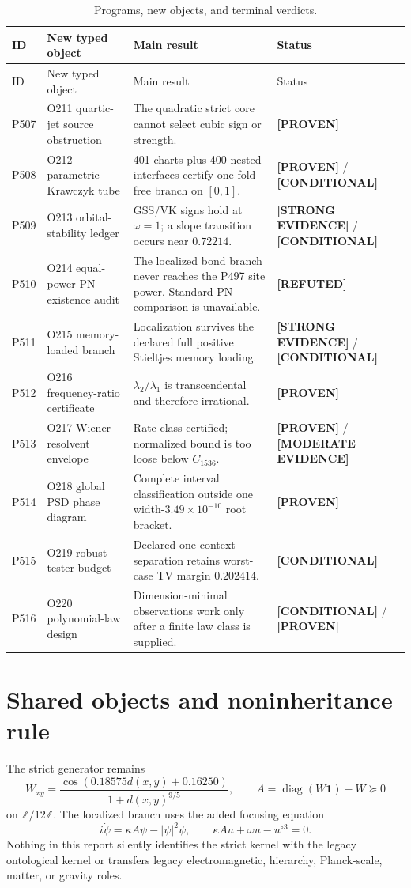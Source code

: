 \documentclass[11pt,a4paper]{article}
\theoremstyle{definition}
\theoremstyle{remark}
\newcommand{\Z}{\mathbb Z}
\newcommand{\status}[2]{\textcolor{#1}{\textbf{[#2]}}}
\newcommand{\proven}{\status{fingreen}{PROVEN}}
\newcommand{\strong}{\status{finblue}{STRONG EVIDENCE}}
\newcommand{\moderate}{\status{finorange}{MODERATE EVIDENCE}}
\newcommand{\refuted}{\status{finred}{REFUTED}}
\newcommand{\conditional}{\status{fingray}{CONDITIONAL}}
\begin{document}
\begin{longtable}{@{}p{}p{}p{}p{}@{}}
\caption{Programs, new objects, and terminal verdicts.}\\
\toprule
ID & New typed object & Main result & Status\\
\midrule
\endfirsthead
\toprule
ID & New typed object & Main result & Status\\
\midrule
\endhead
P507 & O211 quartic-jet source obstruction & The quadratic strict core cannot select cubic sign or strength. & \proven\\
P508 & O212 parametric Krawczyk tube & 401 charts plus 400 nested interfaces certify one fold-free branch on $[0,1]$. & \proven{} / \conditional\\
P509 & O213 orbital-stability ledger & GSS/VK signs hold at $\omega=1$; a slope transition occurs near $0.72214$. & \strong{} / \conditional\\
P510 & O214 equal-power PN existence audit & The localized bond branch never reaches the P497 site power. Standard PN comparison is unavailable. & \refuted\\
P511 & O215 memory-loaded branch & Localization survives the declared full positive Stieltjes memory loading. & \strong{} / \conditional\\
P512 & O216 frequency-ratio certificate & $\lambda_2/\lambda_1$ is transcendental and therefore irrational. & \proven\\
P513 & O217 Wiener--resolvent envelope & Rate class certified; normalized bound is too loose below $C_{1536}$. & \proven{} / \moderate\\
P514 & O218 global PSD phase diagram & Complete interval classification outside one width-$3.49\times10^{-10}$ root bracket. & \proven\\
P515 & O219 robust tester budget & Declared one-context separation retains worst-case TV margin $0.202414$. & \conditional\\
P516 & O220 polynomial-law design & Dimension-minimal observations work only after a finite law class is supplied. & \conditional{} / \proven\\
\bottomrule
\end{longtable}

\section{Shared objects and noninheritance rule}

The strict generator remains
\[
 W_{xy}=\frac{\cos(0.18575d(x,y)+0.16250)}{1+d(x,y)^{9/5}},
 \qquad A=\operatorname{diag}(W\mathbf1)-W\succeq0
\]
on $\Z/12\Z$. The localized branch uses the added focusing equation
\begin{equation}
 i\dot\psi=\kappa A\psi-|\psi|^2\psi,
 \qquad
 \kappa Au+\omega u-u^{\circ3}=0.
 \label{eq:dnls}
\end{equation}
Nothing in this report silently identifies the strict kernel with the legacy ontological kernel or transfers legacy electromagnetic, hierarchy, Planck-scale, matter, or gravity roles.
\end{document}
